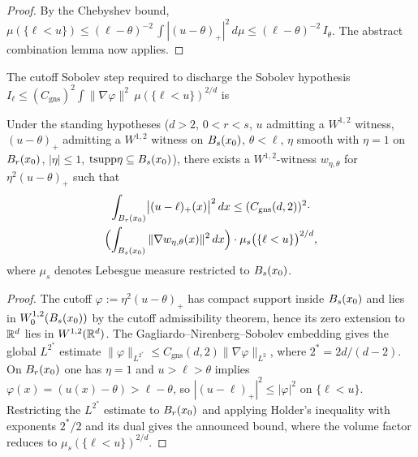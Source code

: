 \begin{proof}
\leanok
{}

By the Chebyshev bound, $\mu(\{\ell < u\}) \le (\ell-\theta)^{-2}\,
\int|(u-\theta)_+|^2 \, d\mu \le (\ell-\theta)^{-2}\, I_\theta$. The
abstract combination lemma now applies.
\end{proof}

The cutoff Sobolev step required to discharge the Sobolev hypothesis
$I_\ell \le (C_{\mathrm{gns}})^2 \int \|\nabla \varphi\|^2\,
\mu(\{\ell < u\})^{2/d}$ is

\begin{theorem}
\label{thm:deGiorgi_cutoffSobolev_on_concentricBalls_of_ballPosPart}
\leanok
{}
Under the standing hypotheses ($d > 2$, $0 < r < s$, $u$ admitting a
$W^{1,2}$ witness, $(u-\theta)_+$ admitting a $W^{1,2}$ witness on
$B_{s}(x_0)$, $\theta < \ell$, $\eta$ smooth with $\eta = 1$ on
$B_{r}(x_0)$, $|\eta| \le 1$, $\mathrm{tsupp} \eta \subseteq
B_{s}(x_0)$), there exists a $W^{1,2}$-witness $w_{\eta,\theta}$
for $\eta^2 (u-\theta)_+$ such that
\begin{multline*}
  \int_{B_{r}(x_0)} \bigl|(u-\ell)_+(x)\bigr|^2 \, dx
  \le (C_{\mathrm{gns}}(d,2))^2 \cdot \\
   \Bigl(\int_{B_{s}(x_0)} \|\nabla w_{\eta,\theta}(x)\|^2 \, dx
   \Bigr) \cdot
    \mu_s\bigl(\{\ell < u\}\bigr)^{2/d},
\end{multline*}
where $\mu_s$ denotes Lebesgue measure restricted to $B_{s}(x_0)$.
\end{theorem}

\begin{proof}
\leanok
{}

The cutoff $\varphi := \eta^2 (u-\theta)_+$ has compact support inside
$B_{s}(x_0)$ and lies in $W_0^{1,2}(B_{s}(x_0))$ by
the cutoff admissibility theorem, hence its zero extension to $\mathbb{R}^d$
lies in $W^{1,2}(\mathbb{R}^d)$. The Gagliardo--Nirenberg--Sobolev embedding
gives the global $L^{2^*}$ estimate
$\|\varphi\|_{L^{2^*}} \le C_{\mathrm{gns}}(d,2) \|\nabla
\varphi\|_{L^2}$, where $2^* = 2d/(d-2)$. On $B_{r}(x_0)$ one has
$\eta = 1$ and $u > \ell > \theta$ implies $\varphi(x) = (u(x) -
\theta) > \ell - \theta$, so $|(u-\ell)_+|^2 \le |\varphi|^2$ on
$\{\ell < u\}$. Restricting the $L^{2^*}$ estimate to $B_{r}(x_0)$
and applying Holder's inequality with exponents $2^*/2$ and its dual
gives the announced bound, where the volume factor reduces to
$\mu_s(\{\ell < u\})^{2/d}$.
\end{proof}


